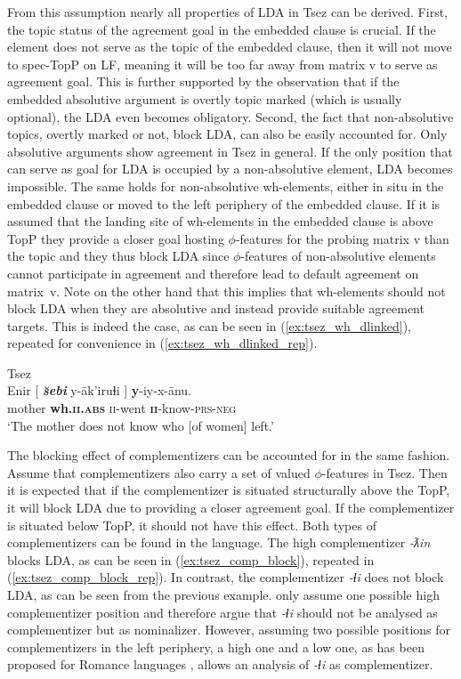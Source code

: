 \documentclass[output=paper
,modfonts
,nonflat]{langsci/langscibook}
\begin{document}
From this assumption nearly all properties of LDA in Tsez can be derived. First, the topic status of the agreement goal in the embedded clause is crucial. If the element does not serve as the topic of the embedded clause, then it will not move to spec-TopP on LF, meaning it will be too far away from matrix v to serve as agreement goal. This is further supported by the observation that if the embedded absolutive argument is overtly topic marked (which is usually optional), the LDA even becomes obligatory. Second, the fact that non-absolutive topics, overtly marked or not, block LDA, can also be easily accounted for. Only absolutive arguments show agreement in Tsez in general. If the only position that can serve as goal for LDA is occupied by a non-absolutive element, LDA becomes impossible. The same holds for non-absolutive wh-elements, either in situ in the embedded clause or moved to the left periphery of the embedded clause. If it is assumed that the landing site of wh-elements in the embedded clause is above TopP they provide a closer goal hosting $ \phi $-features for the probing matrix v than the topic and they thus block LDA since $ \phi $-features of non-absolutive elements cannot participate in agreement and therefore lead to default agreement on matrix~v. Note on the other hand that this implies that wh-elements should not block LDA when they are absolutive and instead provide suitable agreement targets. This is indeed the case, as can be seen in (\ref{ex:tsez_wh_dlinked}), repeated for convenience in (\ref{ex:tsez_wh_dlinked_rep}).
\begin{exe}
\ex Tsez \citep[][fn. 20]{Polinsky_Potsdam2001}\label{ex:tsez_wh_dlinked_rep}\\
	\gll Enir [ \textbf{\textit{\u{s}ebi}} y-\=ak'iruɬi ] \textbf{y}-iy-x-\={a}nu.\\
		 mother {} \textbf{wh.\textsc{ii.abs}} \textsc{ii}-went {} \textbf{\textsc{ii}}-know-\textsc{prs-neg}\\
	\glt `The mother does not know who [of women] left.'
\end{exe}
The blocking effect of complementizers can be accounted for in the same fashion. Assume that complementizers also carry a set of valued $ \phi $-features in Tsez. Then it is expected that if the complementizer is situated structurally above the TopP, it will block LDA due to providing a closer agreement goal. If the complementizer is situated below TopP, it should not have this effect. Both types of complementizers can be found in the language. The high complementizer \textit{-ƛin} blocks LDA, as can be seen in (\ref{ex:tsez_comp_block}), repeated in (\ref{ex:tsez_comp_block_rep}). In contrast, the complementizer \textit{-ɬi} does not block LDA, as can be seen from the previous example. \citet{Polinsky_Potsdam2001} only assume one possible high complementizer position and therefore argue that \textit{-ɬi} should not be analysed as complementizer but as nominalizer. However, assuming two possible positions for complementizers in the left periphery, a high one and a low one, as has been proposed for Romance languages \citep{Ledgeway2005}, allows an analysis of \textit{-ɬi} as complementizer.
\end{document}
